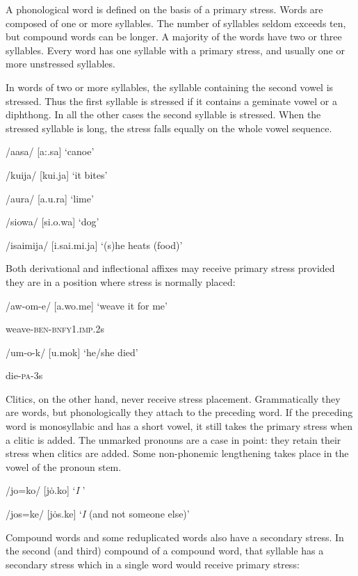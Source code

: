 A phonological word is defined on the basis of a primary stress. Words are composed of one or more syllables. The number of syllables seldom exceeds ten, but compound words can be longer. A majority of the words have two or three syllables.  Every word has one syllable with a primary stress, and usually one or more unstressed syllables. 

In words of two or more syllables, the syllable containing the second vowel is stressed. Thus the first syllable is stressed if it contains a geminate vowel or a diphthong. In all the other cases the second syllable is stressed. When the stressed syllable is long, the stress falls equally on the whole vowel sequence. 

/aasa/  [{{\textprimstress}a:.sa}]  `canoe'

/kuija/  [{{\textprimstress}kui.ja}]  `it bites'

/a{\textphi}ura/  [a.{{\textprimstress}}{\textphi}u.ra]  `lime'

/siowa/  [si.{{\textprimstress}o.wa}]  `dog'

/isaimija/  [i.{{\textprimstress}sai.mi.ja}]  `(s)he heats (food)'

Both derivational and inflectional affixes may receive primary stress provided they are in a position where stress is normally placed:

/aw-om-e/  [a.{{\textprimstress}wo.me}]  `weave it for me'

weave-\textsc{ben}-\textsc{bnfy1}.\textsc{imp}.2s

/um-o-k/  [u.{{\textprimstress}mok}]  `he/she died'

die-\textsc{pa}-3s

Clitics, on the other hand, never receive stress placement. Grammatically they are words, but phonologically they attach to the preceding word. If the preceding word is monosyllabic and has a short vowel, it still takes the primary stress when a clitic is added. The unmarked pronouns are a case in point: they retain their stress when clitics are added. Some non-phonemic lengthening takes place in the vowel of the pronoun stem.

/jo=ko/  [{{\textprimstress}}jo{\.{}.ko}]  `\textit{I} '

/jos=ke/  [{{\textprimstress}}jo{\.{}s.ke}]  `\textit{I} (and not someone else)' 

Compound words and some reduplicated words also have a secondary stress.  In the second (and third) compound of a compound word, that syllable has a secondary stress which in a single word would receive primary stress: 

